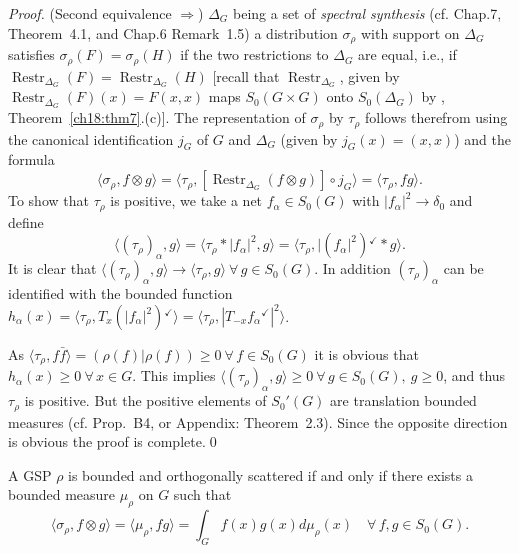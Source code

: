 \documentclass[graybox]{svmult}
\newcommand\checkm{{^\checkmark}}  %
\begin{document}
\begin{proof}
(Second equivalence $\Rightarrow$) $\varDelta _{G}$ being a set of
\textit{spectral synthesis} (cf.  \cite{re68} Chap.7, Theorem~4.1, and Chap.6
Remark~1.5) a distribution ${\sigma_{ \rho}}$ with support on $\varDelta
_{G}$ satisfies ${\sigma_{ \rho}}(F) = {\sigma_{ \rho}}(H)$
if the two restrictions to $\varDelta _{G}$ are equal, i.e.,
if ${\operatorname{Restr}_{\varDelta_{G}}}(F) = {\operatorname{Restr}_{\varDelta_{G}}} (H)$ [recall that $ {\operatorname{Restr}_{\varDelta_{G}}}$, given by  ${\operatorname{Restr}_{\varDelta_{G}}}(F)(x) = F(x,x)$
maps $S_{0}(G \times G)$ onto
$S_{0}(\varDelta _{G})$ by \cite{fe81-2},
Theorem~\ref {ch18:thm7}.(c)].  The representation of
$\sigma _{\rho}$ by $\tau_{\rho}$ follows therefrom
using the canonical identification $j_{G}$ of $G$
and $\varDelta _{G}$ (given by $j_{G}(x) = (x,x)$) and the formula
\[
\langle{\sigma_{ \rho}},f\otimes g\rangle =
\langle\tau_{\rho},
[{\operatorname{Restr}_{\varDelta_{G}}}(f\otimes g)] \circ j_{G} \rangle =
\langle\tau_{\rho},f g \rangle.
\]
To show that $\tau_{\rho}$ is positive, we take a net
$f_{\alpha}  \in  {S_{0}(G)}$ with $|f_{\alpha}|^2  \rightarrow
\delta_0$ and define
\[
\langle ( \tau_{\rho})_{\alpha},g \rangle
= \langle \tau_{\rho} \ast
|f_{\alpha}|^2,g \rangle = \langle \tau_{\rho},
|(f_{\alpha}|^2) \checkm  \ast g \rangle.  %
\]
It is clear that $\langle (\tau_{\rho})_{\alpha},g \rangle \rightarrow
\langle \tau_{\rho},g \rangle  \ \forall \,  g  \in  {S_{0}(G)}$. In
addition $(\tau_{\rho})_{\alpha}$ can be identified with the bounded
function $h_{\alpha}(x) =
\langle \tau_{\rho}, T_x (|f_{\alpha}|^2) \checkm \rangle
 = \langle \tau_{\rho}, |T_{-x} {f_{\alpha}\checkm}|^2 \rangle$.


As $\langle \tau_{\rho}, f \bar{f}\rangle
= (\rho(f)|\rho(f))  \geq  0  \ \forall \,  f  \in {S_{0}(G)}$
it is obvious that $h_{\alpha}(x)  \geq  0  \ \forall \,  x  \in
 G$. This implies
 $\langle (\tau_{\rho})_{\alpha},g \rangle  \geq    0
 \ \forall \,  g  \in  {S_{0}(G)}, \: g \geq 0$, and thus
$\tau_{\rho}$ is positive.  %
But the positive elements
of ${S_0{ '}(G)}$ are translation bounded measures (cf. \cite{fe80}
Prop.\ B4, or \cite{ho89} Appendix: Theorem~2.3).
Since the opposite direction is obvious the proof is complete.\qed
\end{proof}

\setcounter{corollary}{1}
\begin{corollary}\label{ch18:cor2}
A GSP $\rho $ is bounded and
orthogonally scattered
if and only if there exists a
bounded measure $\mu_{\rho}$ on $G$ such that
\[
\langle{\sigma_{\rho}},f\otimes g\rangle = \langle\mu_{\rho},fg\rangle
= \int^{}_{G}f(x)g(x)d\mu_{\rho}(x) \quad
\forall \, f,g \in {S_{0}(G)}.
\]
\end{corollary}
\end{document}
